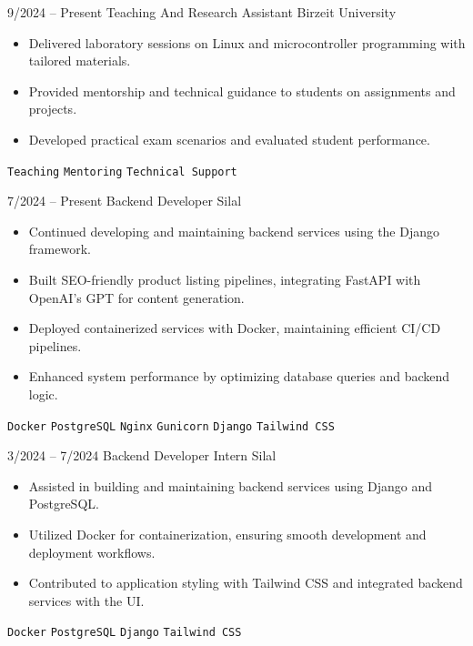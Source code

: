 \documentclass[9pt]{developercv} %
\begin{document}
\begin{entrylist}

    \entry
    {9/2024 -- Present}
    {Teaching And Research Assistant}
    {Birzeit University}
    {\vspace{-10pt}
    \begin{itemize}[noitemsep,topsep=0pt,parsep=0pt,partopsep=0pt, leftmargin=-1pt]
        \item Delivered laboratory sessions on Linux and microcontroller programming with tailored materials.
        \item Provided mentorship and technical guidance to students on assignments and projects.
        \item Developed practical exam scenarios and evaluated student performance.
    \end{itemize}
    \texttt{Teaching} \slashsep \texttt{Mentoring} \slashsep \texttt{Technical Support}}
    
    \entry
        {7/2024 -- Present}
        {Backend Developer}
        {Silal}
        {\vspace{-10pt}
        \begin{itemize}[noitemsep,topsep=0pt,parsep=0pt,partopsep=0pt, leftmargin=-1pt]
            \item Continued developing and maintaining backend services using the Django framework.
            \item Built SEO-friendly product listing pipelines, integrating FastAPI with OpenAI's GPT for content generation.
            \item Deployed containerized services with Docker, maintaining efficient CI/CD pipelines.
            \item Enhanced system performance by optimizing database queries and backend logic.
        \end{itemize} 
        \texttt{Docker} \slashsep \texttt{PostgreSQL} \slashsep \texttt{Nginx} \slashsep \texttt{Gunicorn} \slashsep \texttt{Django} \slashsep \texttt{Tailwind CSS}}
    
    \entry
        {3/2024 -- 7/2024}
        {Backend Developer Intern}
        {Silal}
        {\vspace{-10pt}
        \begin{itemize}[noitemsep,topsep=0pt,parsep=0pt,partopsep=0pt, leftmargin=-1pt]
            \item Assisted in building and maintaining backend services using Django and PostgreSQL.
            \item Utilized Docker for containerization, ensuring smooth development and deployment workflows.
            \item Contributed to application styling with Tailwind CSS and integrated backend services with the UI.
        \end{itemize} 
        \texttt{Docker} \slashsep \texttt{PostgreSQL} \slashsep \texttt{Django} \slashsep \texttt{Tailwind CSS}}
\end{entrylist}
\end{document}
